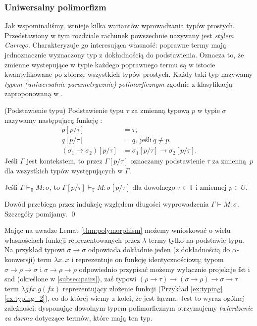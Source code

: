 \subsubsection{Uniwersalny polimorfizm}\label{subsec:polymorphism}
Jak wspominaliśmy, istnieje kilka wariantów wprowadzania typów prostych. Przedstawiony w tym rozdziale rachunek powszechnie nazywany jest \emph{stylem Currego}. Charakteryzuje go interesująca własność: poprawne termy mają jednoznacznie wyznaczony typ z dokładnością do podstawienia. Oznacza to, że zmienne wystepujące w typie każdego poprawnego termu są w istocie kwantyfikowane po zbiorze wszystkich typów prostych. Każdy taki typ nazywamy \emph{typem (uniwersalnie parametrycznie) polimorficznym} zgodnie z klasyfikacją zaproponowaną w \cite{Cardelli1985}.

\begin{definicja}(Podstawienie typu)
Podstawienie typu \(\tau\) za zmienną typową \(p\) w typie \(\sigma\) nazywamy następującą funkcję :
\begin{align*}
  p[p/ \tau] &=\tau,\\
  q[p/ \tau] &=q,\ \text{jeśli}\ q\not\equiv p,\\
  (\sigma_1 \to \sigma_2) [p/\tau] &= \sigma_1 [p/\tau] \to \sigma_2 [p/\tau].
\end{align*}
  Jeśli \(\Gamma\) jest kontekstem, to przez \(\Gamma[p/\tau]\) oznaczamy podstawienie \(\tau\) za zmienną \(p\) dla wszystkich typów występujących w \(\Gamma\).
\end{definicja}

\begin{lemat}\label{thm:polymorphism}
  Jeśli \(\Gamma\vdash_\mathbb{T} M:\sigma\), to \(\Gamma [p/\tau]\vdash_\mathbb{T} M:\sigma[p/\tau]\) dla dowolnego \(\tau\in\mathbb{T}\) i zmiennej \(p\in U\).
\end{lemat}
\begin{dowod}
  Dowód przebiega przez indukcję względem długości wyprowadzenia \(\Gamma\vdash M:\sigma\). Szczegóły pomijamy. \qed
\end{dowod}

Mając na uwadze Lemat \ref{thm:polymorphism} możemy wnioskować o wielu własnościach funkcji reprezentowanych przez \(\lambda\)-termy tylko na podstawie typu. Na przykład typowi \(\sigma\to\sigma\) odpowiada dokładnie jeden (z dokładnością do \(\alpha\)-konwersji) term \(\lambda x.\,x\) i reprezentuje on funkcję identycznościową; typom \(\sigma\to\rho\to\sigma\) i \(\sigma\to\rho\to\rho\) odpowiednio przypisać możemy wyłącznie projekcje fst i snd (określone w \ref{subsec:pairs}), zaś typowi \((\rho\to\tau) \to (\sigma\to\rho)\to\sigma\to\tau\) term \(\lambda g f x. g (f x)\) reprezentujący złożenie funkcji (Przykład \ref{ex:typing} \ref{ex:typing_2}), co do której wiemy z kolei, że jest łączna.
Jest to wyraz ogólnej zależności: dysponując dowolnym typem polimorficznym otrzymujemy \emph{twierdzenie za darmo} \cite{Wadler1989} dotyczące termów, które mają ten typ. 

